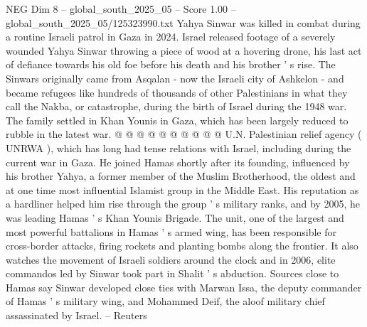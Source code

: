 \begin{textsample}{NEG Dim 8 – global\_south\_2025\_05 – Score 1.00 – global\_south\_2025\_05/125323990.txt}
Yahya Sinwar was killed in combat during a routine Israeli patrol in Gaza in 2024.
Israel released footage of a severely wounded Yahya Sinwar throwing a piece of wood at a hovering drone, his last act of defiance towards his old foe before his death and his brother ' s rise.
The Sinwars originally came from Asqalan - now the Israeli city of Ashkelon - and became refugees like hundreds of thousands of other Palestinians in what they call the Nakba, or catastrophe, during the birth of Israel during the 1948 war.
The family settled in Khan Younis in Gaza, which has been largely reduced to rubble in the latest war. @ @ @ @ @ @ @ @ @ @ U.N.
Palestinian relief agency ( UNRWA ), which has long had tense relations with Israel, including during the current war in Gaza.
He joined Hamas shortly after its founding, influenced by his brother Yahya, a former member of the Muslim Brotherhood, the oldest and at one time most influential Islamist group in the Middle East.
His reputation as a hardliner helped him rise through the group ' s military ranks, and by 2005, he was leading Hamas ' s Khan Younis Brigade.
The unit, one of the largest and most powerful battalions in Hamas ' s armed wing, has been responsible for cross-border attacks, firing rockets and planting bombs along the frontier.
It also watches the movement of Israeli soldiers around the clock and in 2006, elite commandos led by Sinwar took part in Shalit ' s abduction.
Sources close to Hamas say Sinwar developed close ties with Marwan Issa, the deputy commander of Hamas ' s military wing, and Mohammed Deif, the aloof military chief assassinated by Israel. -- Reuters

\end{textsample}
